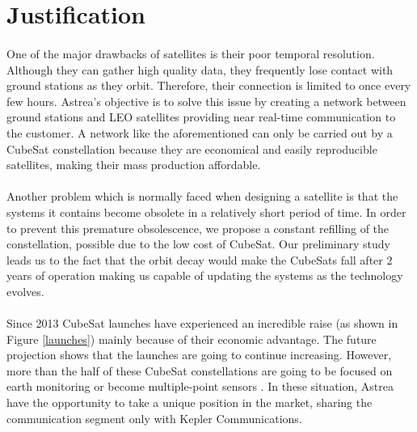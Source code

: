 \documentclass[12pt]{scrartcl}
\begin{document}
\section*{Justification}
\paragraph{}
One of the major drawbacks of satellites is their poor temporal resolution. Although they can gather high quality data, they frequently lose contact with ground stations as they orbit. Therefore, their connection is limited to once every few hours. Astrea’s objective is to solve this issue by creating a network between ground stations and LEO satellites providing near real-time communication to the customer. A network like the aforementioned can only be carried out by a CubeSat constellation because they are economical and easily reproducible satellites, making their mass production affordable.

\paragraph{}
Another problem which is normally faced when designing a satellite is that the systems it contains become obsolete in a relatively short period of time. In order to prevent this premature obsolescence, we propose a constant refilling of the constellation, possible due to the low cost of CubeSat. Our preliminary study leads us to the fact that the orbit decay would make the CubeSats fall after 2 years of operation making us capable of updating the systems as the technology evolves.

\paragraph{}
Since 2013 CubeSat launches have experienced an incredible raise (as shown in Figure \ref{launches}) mainly because of their economic advantage. The future projection shows that the launches are going to continue increasing. However, more than the half of these CubeSat constellations are going to be focused on earth monitoring or become multiple-point sensors \cite{SpaceWorks}. In these situation, Astrea have the opportunity to take a unique position in the market, sharing the communication segment only with Kepler Communications\cite{keppler}.
\end{document}
